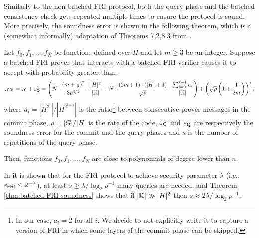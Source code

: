 Similarly to the non-batched FRI protocol, both the query phase and the batched consistency check gets repeated multiple times to ensure the protocol is sound. More precisely, the soundness error is shown in the following theorem, which is a (somewhat informally) adaptation of Theorems 7.2,8.3 from \cite{EPRINT:BCIKS20}.
\begin{theorem}\label{thm:batched-FRI-soundness}
  Let $f_0,f_1,\dots,f_N$ be functions defined over $H$ and let $m \geq 3$ be an integer. Suppose a batched FRI prover that interacts with a batched FRI verifier causes it to accept with probability greater than:
  \[
    \varepsilon_{\textsf{FRI}} = \varepsilon_{\textsf{C}} + \varepsilon_{\textsf{Q}}^s =  \left( N \cdot \frac{(m + \frac{1}{2})^7}{3 \rho^{3/2}} \cdot \frac{|H|^2}{|\mathbb{K}|} + N \cdot \frac{(2m+1) \cdot (|H|+1)}{\sqrt{\rho}} \cdot \frac{\sum_{i=0}^{k-1} a_i}{|\mathbb{K}|} \right) + \left(\sqrt{\rho} \left(1 + \frac{1}{2m}\right)\right)^s,
  \] 
  where $a_i = |H^{2^i}|/|H^{2^{i+1}}|$ is the ratio\footnote{In our case, $a_i = 2$ for all $i$. We decide to not explicitly write it to capture a version of FRI in which some layers of the commit phase can be skipped.} between consecutive prover messages in the commit phase, $\rho = |G| / |H|$ is the rate of the code, $\varepsilon_{\textsf{C}}$ and $\varepsilon_{\textsf{Q}}$ are respectively the soundness error for the commit and the query phases and $s$ is the number of repetitions of the query phase.

  Then, functions $f_0,f_1,\dots,f_N$ are close to polynomials of degree lower than $n$.
\end{theorem}

	
In \cite{ICALP:BBHR18} it is shown that for the FRI protocol to achieve security parameter $\lambda$ (i.e., $\varepsilon_{\textsf{FRI}} \leq 2^{-\lambda}$), at least $s \geq \lambda/\log_2{\rho^{-1}}$ many queries are needed, and Theorem \ref{thm:batched-FRI-soundness} shows that if $|\mathbb{K}| \gg |H|^2$ then $s \approx 2\lambda/\log_2{\rho^{-1}}$. 

